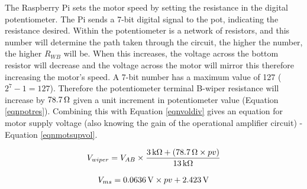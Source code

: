 \documentclass[twoside,a4]{report}
\def\br{\newline \newline \noindent}
\begin{document}
	
	\noindent
	The Raspberry Pi sets the motor speed by setting the resistance in the digital potentiometer. The Pi sends a 7-bit digital signal to the pot, indicating the resistance desired. Within the potentiometer is a network of resistors, and this number will determine the path taken through the circuit, the higher the number, the higher \(R_{WB}\) will be. When this increases, the voltage across the bottom resistor will decrease and the voltage across the motor will mirror this therefore increasing the motor's speed.
	\br
	A 7-bit number has a maximum value of 127 ($2^7 - 1 = 127$). Therefore the potentiometer terminal B-wiper resistance will increase by $78.7\,\rm \Omega$ given a unit increment in potentiometer value (Equation \ref{eqnpotres}). Combining this with Equation \ref{eqnvoldiv} gives an equation for motor supply voltage (also knowing the gain of the operational amplifier circuit) - Equation \ref{eqnmotsupvol}.
	
	\begin{equation}
	V_{wiper} = V_{AB}\times \frac{3{\,\rm k\Omega} + \left(78.7{\,\rm\Omega} \times pv\right)}{13{\,\rm k\Omega}}
	\label{eqnpotres}
	\end{equation}
	
	
	\begin{equation}
	V_{ms} = 0.0636\, {\rm V} \times pv + 2.423\, {\rm V}
	\label{eqnmotsupvol}
	\end{equation}
	
	
\end{document}
